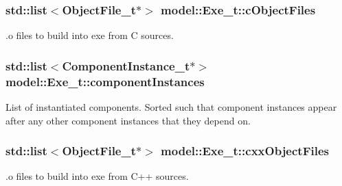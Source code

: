 \subsubsection[{\texorpdfstring{c\+Object\+Files}{cObjectFiles}}]{\setlength{\rightskip}{0pt plus 5cm}std\+::list$<${\bf Object\+File\+\_\+t}$\ast$$>$ model\+::\+Exe\+\_\+t\+::c\+Object\+Files}\hypertarget{structmodel_1_1_exe__t_a74b530bfebded4e1d6bcb3a263284642}{}\label{structmodel_1_1_exe__t_a74b530bfebded4e1d6bcb3a263284642}


.o files to build into exe from C sources. 

\subsubsection[{\texorpdfstring{component\+Instances}{componentInstances}}]{\setlength{\rightskip}{0pt plus 5cm}std\+::list$<${\bf Component\+Instance\+\_\+t}$\ast$$>$ model\+::\+Exe\+\_\+t\+::component\+Instances}\hypertarget{structmodel_1_1_exe__t_aadd56a419d93a166c962c3b12aef0c19}{}\label{structmodel_1_1_exe__t_aadd56a419d93a166c962c3b12aef0c19}
List of instantiated components. Sorted such that component instances appear after any other component instances that they depend on. 
\subsubsection[{\texorpdfstring{cxx\+Object\+Files}{cxxObjectFiles}}]{\setlength{\rightskip}{0pt plus 5cm}std\+::list$<${\bf Object\+File\+\_\+t}$\ast$$>$ model\+::\+Exe\+\_\+t\+::cxx\+Object\+Files}\hypertarget{structmodel_1_1_exe__t_a0e897304a29f49fa794cd0904e4e1dd7}{}\label{structmodel_1_1_exe__t_a0e897304a29f49fa794cd0904e4e1dd7}


.o files to build into exe from C++ sources. 

